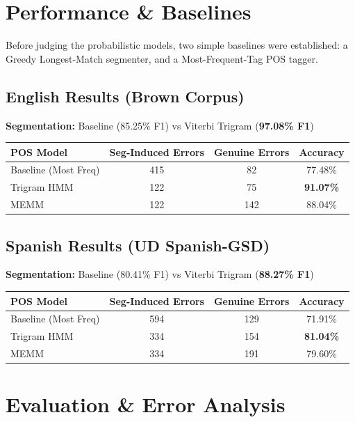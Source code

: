 \documentclass[11pt]{article}
\begin{document}
\section{Performance \& Baselines}

Before judging the probabilistic models, two simple baselines were established: a Greedy Longest-Match segmenter, and a Most-Frequent-Tag POS tagger.

\subsection*{English Results (Brown Corpus)}

\textbf{Segmentation:} Baseline (85.25\% F1) vs Viterbi Trigram (\textbf{97.08\% F1})

\begin{table}[h]
\centering
\begin{tabular}{lccc}
\toprule
\textbf{POS Model} & \textbf{Seg-Induced Errors} & \textbf{Genuine Errors} & \textbf{Accuracy} \\
\midrule
Baseline (Most Freq) & 415 & 82 & 77.48\% \\
Trigram HMM & 122 & 75 & \textbf{91.07\%} \\
MEMM & 122 & 142 & 88.04\% \\
\bottomrule
\end{tabular}
\end{table}

\subsection*{Spanish Results (UD Spanish-GSD)}

\textbf{Segmentation:} Baseline (80.41\% F1) vs Viterbi Trigram (\textbf{88.27\% F1})

\begin{table}[h]
\centering
\begin{tabular}{lccc}
\toprule
\textbf{POS Model} & \textbf{Seg-Induced Errors} & \textbf{Genuine Errors} & \textbf{Accuracy} \\
\midrule
Baseline (Most Freq) & 594 & 129 & 71.91\% \\
Trigram HMM & 334 & 154 & \textbf{81.04\%} \\
MEMM & 334 & 191 & 79.60\% \\
\bottomrule
\end{tabular}
\end{table}

\section{Evaluation \& Error Analysis}
\end{document}
